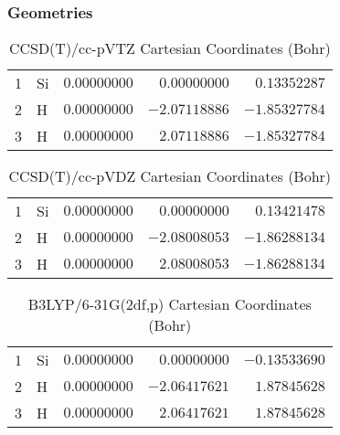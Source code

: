\documentclass[10pt,oneside]{article}
\begin{document}
\clearpage

\subsection{\ \ \ }

\subsubsection*{Geometries}
\begin{table}[h!]
\centering
\caption{CCSD(T)/cc-pVTZ Cartesian Coordinates (Bohr)}
\begin{tabular}{llrrr}
1  & Si & $ 0.00000000$ & $ 0.00000000$ & $ 0.13352287$ \\
2  & H  & $ 0.00000000$ & $-2.07118886$ & $-1.85327784$ \\
3  & H  & $ 0.00000000$ & $ 2.07118886$ & $-1.85327784$ \\
\end{tabular}
\end{table}

\begin{table}[h!]
\centering
\caption{CCSD(T)/cc-pVDZ Cartesian Coordinates (Bohr)}
\begin{tabular}{llrrr}
1  & Si & $ 0.00000000$ & $ 0.00000000$ & $ 0.13421478$ \\
2  & H  & $ 0.00000000$ & $-2.08008053$ & $-1.86288134$ \\
3  & H  & $ 0.00000000$ & $ 2.08008053$ & $-1.86288134$ \\
\end{tabular}
\end{table}

\begin{table}[h!]
\centering
\caption{B3LYP/6-31G(2df,p) Cartesian Coordinates (Bohr)}
\begin{tabular}{llrrr}
1  & Si & $ 0.00000000$ & $ 0.00000000$ & $-0.13533690$ \\
2  & H  & $ 0.00000000$ & $-2.06417621$ & $ 1.87845628$ \\
3  & H  & $ 0.00000000$ & $ 2.06417621$ & $ 1.87845628$ \\
\end{tabular}
\end{table}

\clearpage
\end{document}
